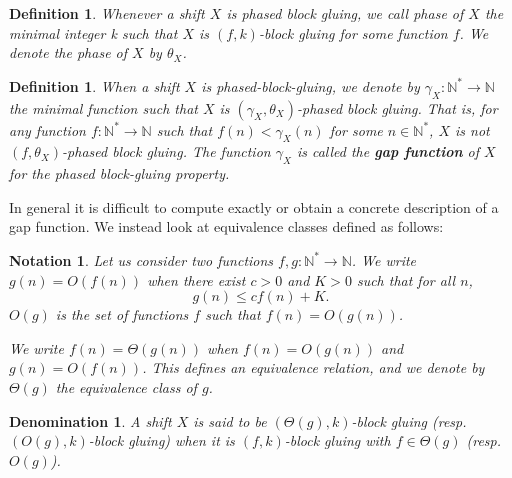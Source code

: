 \documentclass{article}
\newtheorem{definition}[theorem]{Definition}
\newtheorem{notation}[theorem]{Notation}
\newtheorem{denomination}[theorem]{Denomination}
\begin{document}
\begin{definition}
Whenever a shift $X$ is phased block gluing, we call phase of $X$ the minimal integer k such that $X$ is $(f, k)$-block gluing for some function $f$. We  denote the phase of $X$ by $\theta_X$.
\end{definition}

\begin{definition}
When a shift $X$ is phased-block-gluing, we denote by $\gamma_X : \mathbb{N}^\ast \rightarrow \mathbb{N}$ the minimal function such that $X$ is $(\gamma_X, \theta_X)$-phased block gluing. That is, for any function $f : \mathbb{N}^{*} \rightarrow \mathbb{N}$ such that $f(n)< \gamma_X(n)$ for some $n\in\mathbb{N}^\ast$, $X$ is not $(f,\theta_X)$-phased block gluing.
The function $\gamma_X$ is called the \textbf{gap function} of $X$ for the phased block-gluing property.
\end{definition}

In general it is difficult to compute exactly or obtain a concrete description of a gap function. We instead look at equivalence classes defined as follows:

\begin{notation}
Let us consider two functions $f,g : \mathbb{N}^{*} \rightarrow \mathbb{N}$. We write $g(n) = O(f(n))$
when there exist %
$c>0$ and $K>0$ such that for all $n$, 
\[g(n) \le c f(n) + K.\]
$O(g)$ is the set of functions $f$ such that $f(n) = O(g(n))$. 

We write $f(n) = \Theta(g(n))$ when $f(n) = O(g(n))$ and $g(n) = O(f(n))$. This defines an equivalence relation, and we denote by $\Theta(g)$ the equivalence class of $g$.
\end{notation}

\begin{denomination}
A shift $X$ is said to be $(\Theta(g),k)$-block gluing (resp. $(O(g),k)$-block gluing) when it is $(f,k)$-block gluing with $f \in \Theta(g)$ (resp. $O(g)$).
\end{denomination}



\end{document}
